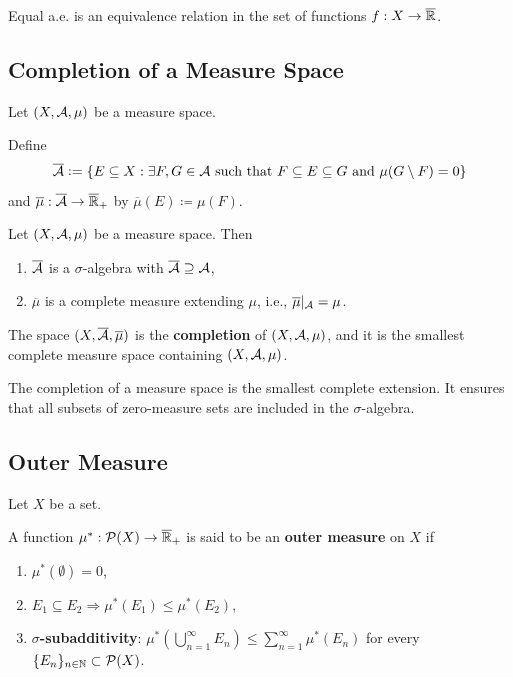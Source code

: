 \begin{remark}
Equal a.e. is an equivalence relation in the set of functions $f: X \to \overline{\mathbb{R}}$.
\end{remark}

\subsection{Completion of a Measure Space}
Let $(X, \mathcal{A}, \mu)$ be a measure space.

Define
\[
\overline{\mathcal{A}} \mathrel{\mathop:}= \{E \subseteq X : \exists F, G \in \mathcal{A} \text{ such that } F \subseteq E \subseteq G \text{ and } \mu(G \setminus F) = 0\}
\]
and $\overline{\mu}: \overline{\mathcal{A}} \to \overline{\mathbb{R}}_+$ by $\overline{\mu}(E) \coloneqq \mu(F)$.

\begin{theorem}
Let $(X, \mathcal{A}, \mu)$ be a measure space. Then
\begin{enumerate}
    \item $\overline{\mathcal{A}}$ is a $\sigma$-algebra with $\overline{\mathcal{A}} \supseteq \mathcal{A}$,
    \item $\overline{\mu}$ is a complete measure extending $\mu$, i.e., $\overline{\mu}|_{\mathcal{A}} = \mu$.
\end{enumerate}
The space $(X, \overline{\mathcal{A}}, \overline{\mu})$ is the \textbf{completion} of $(X, \mathcal{A}, \mu)$, and it is the smallest complete measure space containing $(X, \mathcal{A}, \mu)$.
\end{theorem}

\begin{remark}
The completion of a measure space is the smallest complete extension. It ensures that all subsets of zero-measure sets are included in the $\sigma$-algebra.
\end{remark}

\subsection{Outer Measure}
Let $X$ be a set.

\begin{definition}
A function $\mu^*: \mathcal{P}(X) \to \overline{\mathbb{R}}_+$ is said to be an \textbf{outer measure} on $X$ if
\begin{enumerate}
    \item $\mu^*(\emptyset) = 0$,
    \item $E_1 \subseteq E_2 \Rightarrow \mu^*(E_1) \leq \mu^*(E_2)$,
    \item \textbf{$\sigma$-subadditivity}: $\mu^*\left(\bigcup_{n=1}^{\infty} E_n\right) \leq \sum_{n=1}^{\infty} \mu^*(E_n)$ for every $\{E_n\}_{n \in \mathbb{N}} \subset \mathcal{P}(X)$.
\end{enumerate}
\end{definition}

